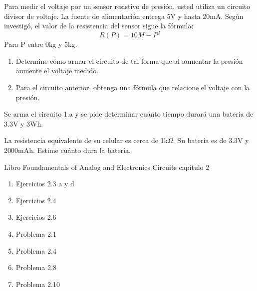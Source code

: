 \begin{example}
\begin{problemset}
\begin{center}
\begin{circuitikz}[american]
        \end{circuitikz}
    \end{center}
    \item Para medir el voltaje por un sensor resistivo de presión, usted utiliza un circuito divisor de voltaje.
    La fuente de alimentación entrega 5V y hasta 20mA. Según investigó, el valor de la resistencia del sensor sigue la fórmula:
    \begin{equation*}
        R(P)=10M-P^2
    \end{equation*}
    Para P entre 0kg y 5kg.
    \begin{enumerate}
        \item Determine cómo armar el circuito de tal forma que al aumentar la presión aumente el voltaje medido.
        \item Para el circuito anterior, obtenga una fórmula que relacione el voltaje con la presión.
    \end{enumerate}


    \item Se arma el circuito 1.a y se pide determinar cuánto tiempo durará una batería de 3.3V y 3Wh.

    \item La resistencia equivalente de su celular es cerca de 1k$\Omega$. Su batería es de 3.3V y 2000mAh. Estime cuánto dura la batería.

    \item Libro Foundamentals of Analog and Electronics Circuits capítulo 2
    \begin{enumerate}
        \item Ejercicios 2.3 a y d
        \item Ejercicios 2.4
        \item Ejercicios 2.6
        \item Problema 2.1
        \item Problema 2.4
        \item Problema 2.8
        \item Problema 2.10

    \end{enumerate}



\end{problemset}
\end{example}

